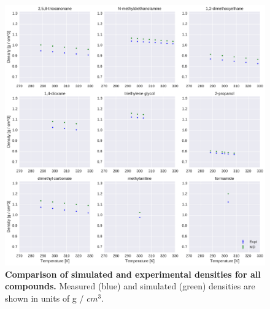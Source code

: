 \documentclass[aip, jcp, reprint]{revtex4-1}  %
\begin{document}
\begin{figure}[alldensity]

\ContinuedFloat

\includegraphics[width=\textwidth]{./figures/densities_versus_temperature_part3.pdf}

\caption{{\bf Comparison of simulated and experimental densities for all compounds.} 
Measured (blue) and simulated (green) densities are shown in units of g / $cm^{3}$.
\label{figure:AllDensities}
}

\end{figure}
\end{document}
